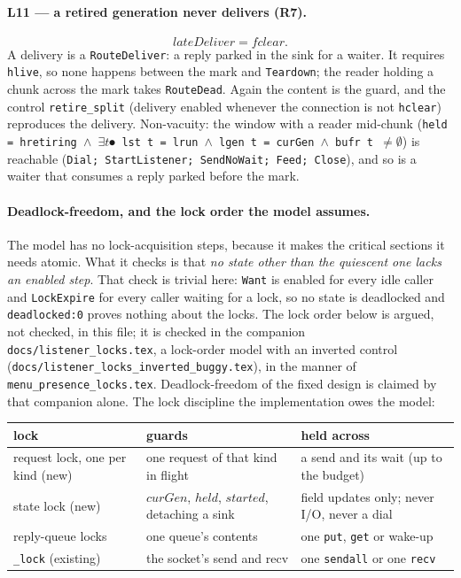 \documentclass[a4paper,10pt,fleqn]{article}
\begin{document}
\paragraph{L11 --- a retired generation never delivers (R7).}
\[ lateDeliver = fclear. \]
A delivery is a \texttt{RouteDeliver}: a reply parked in the sink for a waiter.
It requires \texttt{hlive}, so none happens between the mark and
\texttt{Teardown}; the reader holding a chunk across the mark takes
\texttt{RouteDead}.  Again the content is the guard, and the control
\texttt{retire\_split} (delivery enabled whenever the connection is not
\texttt{hclear}) reproduces the delivery.  Non-vacuity: the window with a
reader mid-chunk (\texttt{held = hretiring $\land$ $\exists t \spot$ lst\,t =
lrun $\land$ lgen\,t = curGen $\land$ bufr\,t $\ne \emptyset$}) is reachable
(\texttt{Dial; StartListener; SendNoWait; Feed; Close}), and so is a waiter
that consumes a reply parked before the mark.

\paragraph{Deadlock-freedom, and the lock order the model assumes.}
The model has no lock-acquisition steps, because it makes the critical
sections it needs atomic.  What it checks is that \emph{no state other than
the quiescent one lacks an enabled step}.  That check is trivial here:
\texttt{Want} is enabled for every idle caller and \texttt{LockExpire} for every
caller waiting for a lock, so no state is deadlocked and \texttt{deadlocked:0}
proves nothing about the locks.  The lock order below is argued, not checked, in
this file; it is checked in the companion \texttt{docs/listener\_locks.tex}, a
lock-order model with an inverted control
(\texttt{docs/listener\_locks\_inverted\_buggy.tex}), in the manner of
\texttt{menu\_presence\_locks.tex}.  Deadlock-freedom of the fixed design is
claimed by that companion alone.  The lock discipline the
implementation owes the model:

\begin{center}
\begin{tabular}{lll}
  lock & guards & held across \\ \hline
  request lock, one per kind (new) & one request of that kind in flight & a send and its wait (up to the budget) \\
  state lock (new) & $curGen$, $held$, $started$, detaching a sink & field updates only; never I/O, never a dial \\
  reply-queue locks & one queue's contents & one \texttt{put}, \texttt{get} or wake-up \\
  \texttt{\_lock} (existing) & the socket's send and recv & one \texttt{sendall} or one \texttt{recv} \\
\end{tabular}
\end{center}
\end{document}
